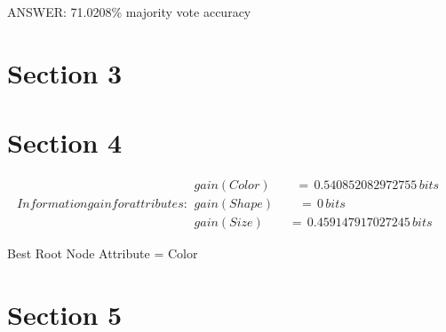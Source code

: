 \documentclass{report}
\begin{document}
ANSWER: 71.0208\% majority vote accuracy

\chapter{Section 3}

\chapter{Section 4}

\begin{subequations}
  Information gain for attributes:
  \begin{flalign*}
    gain(Color)\qquad    =\, 0.540852082972755\, bits \\
    gain(Shape)\qquad    =\, 0\, bits \qquad \qquad \qquad \quad\ \ \, \\
    gain(Size)\qquad     =\, 0.459147917027245\, bits
  \end{flalign*}
\end{subequations}

Best Root Node Attribute = Color

\chapter{Section 5}
\end{document}
